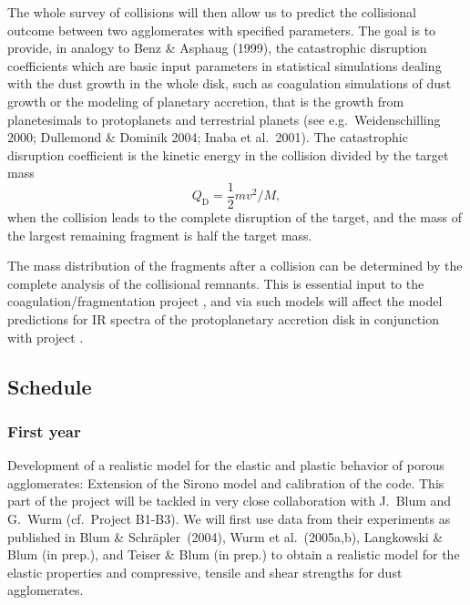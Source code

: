 The whole survey of collisions will then allow us to predict the collisional
outcome between two agglomerates with specified parameters.  The goal is to
provide, in analogy to Benz \& Asphaug (1999), the catastrophic disruption
coefficients which are basic input parameters in statistical simulations
dealing with the dust growth in the whole disk, such as coagulation
simulations of dust growth or the modeling of planetary accretion, that is
the growth from planetesimals to protoplanets and terrestrial planets (see
e.g.~Weidenschilling 2000; Dullemond \& Dominik 2004; Inaba et
al.~2001). The catastrophic disruption coefficient is the kinetic energy in
the collision divided by the target mass
%
\begin{equation} Q_\mathrm{D}= \frac{1}{2}mv^2/M, \end{equation}
%
when the collision leads to the complete disruption of the target, and
the mass of the largest remaining fragment is half the target mass.

The mass distribution of the fragments after a collision can be determined
by the complete analysis of the collisional remnants.  This is essential
input to the coagulation/fragmentation project \projdul{}, and via such
models will affect the model predictions for IR spectra of the
protoplanetary accretion disk in conjunction with project \projwolf{}.
%
\subsection{Schedule}
%
\subsubsection{First year}
%
%
Development of a realistic model for the elastic and plastic behavior of
porous agglomerates: Extension of the Sirono model and calibration of the
code. This part of the project will be tackled in very close collaboration
with J.~Blum and G.~Wurm (cf.\ Project B1-B3).  We will first use data from
their experiments as published in Blum \& Schr\"apler~(2004), Wurm et al.\
(2005a,b), Langkowski \& Blum (in prep.), and Teiser \& Blum (in prep.)  to
obtain a realistic model for the elastic properties and compressive, tensile
and shear strengths for dust agglomerates.

